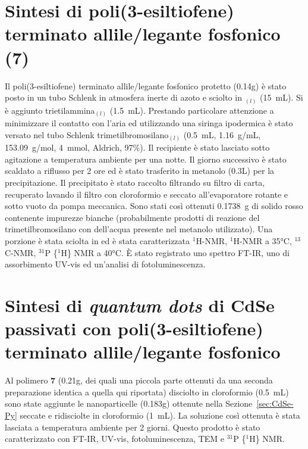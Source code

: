 \section{Sintesi di poli(3-esiltiofene) terminato allile/legante fosfonico (7)}
Il poli(3-esiltiofene) terminato allile/legante fosfonico protetto  (0.14g) è stato posto in un tubo Schlenk in atmosfera inerte di azoto e sciolto in $_{(l)}$ (15~mL). Si è aggiunto trietilammina$_{(l)}$ (1.5~mL). Prestando particolare attenzione a minimizzare il contatto con l'aria ed utilizzando una siringa ipodermica è stato versato nel tubo Schlenk trimetilbromosilano$_{(l)}$ (0.5~mL, 1.16~g/mL, 153.09~g/mol, 4~mmol, Aldrich, 97\%). 
Il recipiente è stato lasciato sotto agitazione a temperatura ambiente per una notte. Il giorno successivo è stato scaldato a riflusso per 2 ore ed è stato trasferito in metanolo (0.3L) per la precipitazione. Il precipitato è stato raccolto filtrando su filtro di carta, recuperato lavando il filtro con cloroformio e seccato all'evaporatore rotante e sotto vuoto da pompa meccanica. Sono stati così ottenuti 0.1738~g di solido rosso contenente impurezze bianche (probabilmente prodotti di reazione del trimetilbromosilano con dell'acqua presente nel metanolo utilizzato). Una porzione è stata sciolta in  ed è stata caratterizzata $^1$H-NMR, $^1$H-NMR a 35°C, $^{13}$C-NMR, $^{31}$P \{$^1$H\} NMR a 40°C. È stato registrato uno spettro FT-IR, uno di assorbimento UV-vis ed un'analisi di fotoluminescenza.

\section[Sintesi di \emph{quantum dots} di CdSe passivati con polimero]{Sintesi di \emph{quantum dots} di CdSe passivati con poli(3-esiltiofene) terminato allile/legante fosfonico}
Al polimero {\bf 7} (0.21g, dei quali una piccola parte ottenuti da una seconda preparazione identica a quella qui riportata) disciolto in cloroformio (0.5~mL) sono state aggiunte le nanoparticelle (0.183g) ottenute nella Sezione~\ref{sec:CdSe-Py} seccate e ridisciolte in cloroformio (1~mL). La soluzione così ottenuta è stata lasciata a temperatura ambiente per 2 giorni. Questo prodotto è stato caratterizzato con FT-IR, UV-vis, fotoluminescenza, TEM e $^{31}$P \{$^1$H\} NMR.
